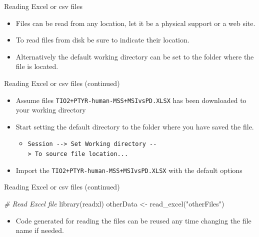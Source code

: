 \documentclass[
  ignorenonframetext,
]{beamer}
\newenvironment{Shaded}{\begin{snugshade}}{\end{snugshade}}
\newcommand{\CommentTok}[1]{\textcolor[rgb]{0.56,0.35,0.01}{\textit{#1}}}
\newcommand{\FunctionTok}[1]{\textcolor[rgb]{0.00,0.00,0.00}{#1}}
\newcommand{\NormalTok}[1]{#1}
\newcommand{\OtherTok}[1]{\textcolor[rgb]{0.56,0.35,0.01}{#1}}
\newcommand{\StringTok}[1]{\textcolor[rgb]{0.31,0.60,0.02}{#1}}
\providecommand{\tightlist}{%
  \setlength{\itemsep}{0pt}\setlength{\parskip}{0pt}}
\begin{document}
\begin{frame}{Reading Excel or csv files}
\protect\hypertarget{reading-excel-or-csv-files}{}
\begin{itemize}
\tightlist
\item
  Files can be read from any location, let it be a physical support or a
  web site.
\item
  To read files from disk be sure to indicate their location.
\item
  Alternatively the default working directory can be set to the folder
  where the file is located.
\end{itemize}
\end{frame}

\begin{frame}[fragile]{Reading Excel or csv files (continued)}
\protect\hypertarget{reading-excel-or-csv-files-continued}{}
\begin{itemize}
\item
  Assume files \texttt{TIO2+PTYR-human-MSS+MSIvsPD.XLSX} has been
  downloaded to your working directory
\item
  Start setting the default directory to the folder where you have saved
  the file.

  \begin{itemize}
  \tightlist
  \item
    \texttt{Session\ -\/-\textgreater{}\ Set\ Working\ directory\ -\/-\textgreater{}\ To\ source\ file\ location...}
  \end{itemize}
\item
  Import the \texttt{TIO2+PTYR-human-MSS+MSIvsPD.XLSX} with the default
  options
\end{itemize}
\end{frame}

\begin{frame}[fragile]{Reading Excel or csv files (continued)}
\protect\hypertarget{reading-excel-or-csv-files-continued-1}{}
\begin{Shaded}
\begin{Highlighting}[]
\CommentTok{\# Read Excel file}
\FunctionTok{library}\NormalTok{(readxl)}
\NormalTok{otherData }\OtherTok{\textless{}{-}} \FunctionTok{read\_excel}\NormalTok{(}\StringTok{"otherFiles"}\NormalTok{)}
\end{Highlighting}
\end{Shaded}

\begin{itemize}
\tightlist
\item
  Code generated for reading the files can be reused any time changing
  the file name if needed.
\end{itemize}
\end{frame}
\end{document}
